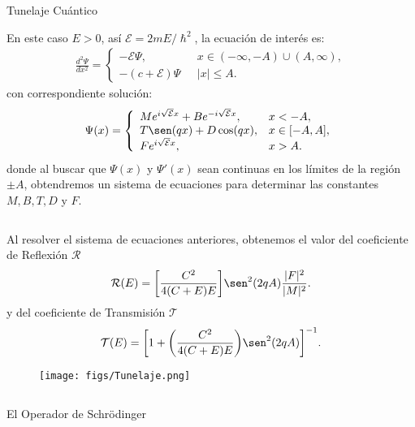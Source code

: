 \documentclass[aspectratio=1610]{beamer}
\begin{document}
\begin{frame}{Tunelaje Cuántico}
   
En este caso $E > 0$, así $\mathcal{E} = 2mE/\hslash^2$, la ecuación de interés es:
\begin{align}
        \frac{d^2\Psi}{dx^2}= 
        \left\{ \begin{array}{ll}
        -\mathcal{E}\Psi,& \:\:\:  x \in (-\infty,-A)\cup (A,\infty),
        \\
        -(c+\mathcal{E})\Psi& \:\:\: |x| \leq A.
        \end{array}
        \right.
        \label{eq:SCsimple}
\end{align}
con correspondiente solución:
\begin{align}
        \Psi(x) = 
        \left\{ \begin{array}{ll}
        Me^{i\sqrt{\mathcal{E}}x}+Be^{-i\sqrt{\mathcal{E}}x}, & x<-A,
        \\
        T\sen(qx) + D\cos(qx), & x \in [-A,A],
        \\ Fe^{i\sqrt{\mathcal{E}}x},& x > A.
        \end{array}
        \right.
        \label{eq:Tunelaje}
\end{align}
donde al buscar que $\Psi(x)$ y $\Psi'(x)$ sean continuas en los límites de la región $\pm A$, obtendremos un sistema de ecuaciones para determinar las constantes $M, B, T, D$ y $F$. 

    
\begin{columns}
\column{37em}
\end{columns}
\end{frame}
\begin{frame}{}
   
Al resolver el sistema de ecuaciones anteriores, obtenemos el valor del coeficiente de Reflexión $\mathcal{R}$
\begin{align*}
    \mathcal{R}(E) = \bigg[\frac{C^2}{4(C+E)E}\bigg]\sen^2(2qA)\frac{|F|^2}{|M|^2}.
\end{align*}
y del coeficiente de Transmisión $\mathcal{T}$
\begin{align*}
    \mathcal{T}(E) = 
    \bigg[1+\bigg(\frac{C^2}{4(C+E)E}\bigg)\sen^2(2qA)\bigg] ^{-1}.
\end{align*}
\begin{figure}[h]
    \centering
    \texttt{[image: figs/Tunelaje.png]}
\end{figure}
    
\begin{columns}
\column{37em}
\end{columns}
\end{frame}
\begin{frame}
\begin{columns}
\column{37em}
\vspace{1cm}
\Huge{\centerline{El Operador de Schrödinger}}
\end{columns}
\end{frame}
\end{document}
